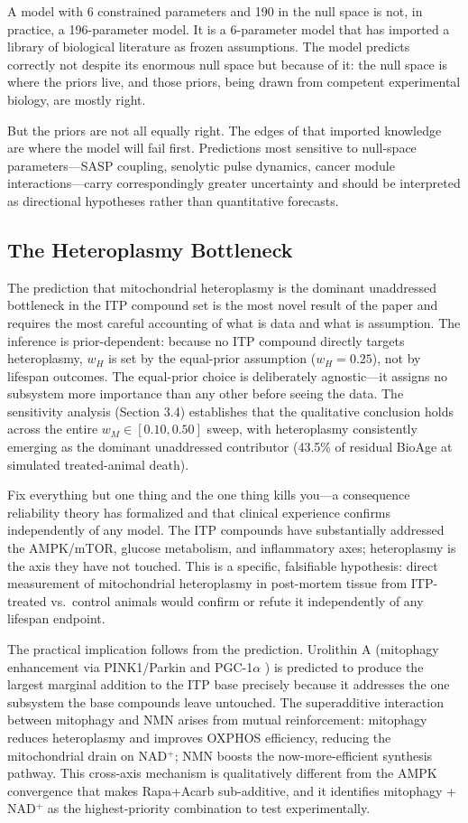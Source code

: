 \documentclass[11pt]{article}
\begin{document}
A model with 6 constrained parameters and 190 in the null space is not, in practice, a 196-parameter model. It is a 6-parameter model that has imported a library of biological literature as frozen assumptions. The model predicts correctly not despite its enormous null space but because of it: the null space is where the priors live, and those priors, being drawn from competent experimental biology, are mostly right.

But the priors are not all equally right. The edges of that imported knowledge are where the model will fail first. Predictions most sensitive to null-space parameters---SASP coupling, senolytic pulse dynamics, cancer module interactions---carry correspondingly greater uncertainty and should be interpreted as directional hypotheses rather than quantitative forecasts.

\subsection{The Heteroplasmy Bottleneck}

The prediction that mitochondrial heteroplasmy is the dominant unaddressed bottleneck in the ITP compound set is the most novel result of the paper and requires the most careful accounting of what is data and what is assumption. The inference is prior-dependent: because no ITP compound directly targets heteroplasmy, $w_H$ is set by the equal-prior assumption ($w_H = 0.25$), not by lifespan outcomes. The equal-prior choice is deliberately agnostic---it assigns no subsystem more importance than any other before seeing the data. The sensitivity analysis (Section 3.4) establishes that the qualitative conclusion holds across the entire $w_M \in [0.10, 0.50]$ sweep, with heteroplasmy consistently emerging as the dominant unaddressed contributor (43.5\% of residual BioAge at simulated treated-animal death).

Fix everything but one thing and the one thing kills you---a consequence reliability theory has formalized \citep{Gavrilov2001} and that clinical experience confirms independently of any model. The ITP compounds have substantially addressed the AMPK/mTOR, glucose metabolism, and inflammatory axes; heteroplasmy is the axis they have not touched. This is a specific, falsifiable hypothesis: direct measurement of mitochondrial heteroplasmy in post-mortem tissue from ITP-treated vs.\ control animals would confirm or refute it independently of any lifespan endpoint.

The practical implication follows from the prediction. Urolithin A (mitophagy enhancement via PINK1/Parkin and PGC-1$\alpha$ \citep{Luan2021}) is predicted to produce the largest marginal addition to the ITP base precisely because it addresses the one subsystem the base compounds leave untouched. The superadditive interaction between mitophagy and NMN arises from mutual reinforcement: mitophagy reduces heteroplasmy and improves OXPHOS efficiency, reducing the mitochondrial drain on NAD$^+$; NMN boosts the now-more-efficient synthesis pathway. This cross-axis mechanism is qualitatively different from the AMPK convergence that makes Rapa+Acarb sub-additive, and it identifies mitophagy + NAD$^+$ as the highest-priority combination to test experimentally.
\end{document}
